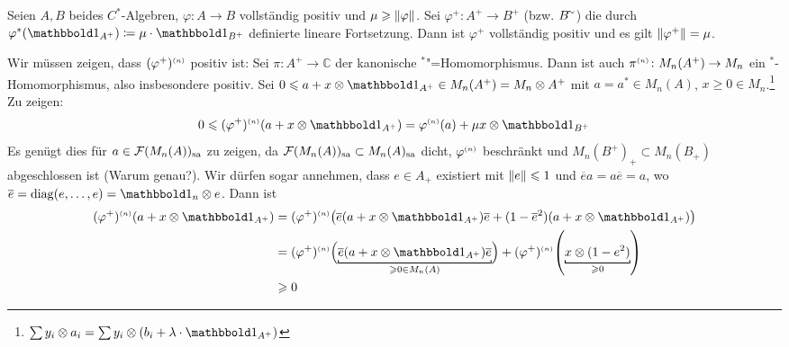\begin{proposition}[label=prop:313]
	Seien $A,B$ beides $C^*$-Algebren, $\varphi \colon A \to B$ vollständig positiv und $\mu \ge \norm*{\varphi}$.
	Sei $\varphi^+ \colon A^+ \to B^+$ (bzw. $B^\simm$) die durch $\varphi^*(\ind_{A^+}) \coloneqq \mu \cdot \ind_{B^+}$ definierte lineare Fortsetzung.
	Dann ist $\varphi^+$ vollständig positiv und es gilt $\norm*{\varphi^+}= \mu$.
\end{proposition}
\begin{beweis}
	Wir müssen zeigen, dass $(\varphi^+)^\ssbrace{n}$ positiv ist: 
	Sei $\pi \colon A^+ \to \mathbb{C}$ der kanonische $^*$"=Homomorphismus.
	Dann ist auch $\pi^\ssbrace{n} \colon M_n(A^+) \to M_n$ ein $^*$-Homomorphismus, also insbesondere positiv.
	Sei $0 \le a + x  \otimes \ind_{A^+} \in M_n(A^+) = M_n \otimes A^+$ mit $a=a^* \in M_n(A)$, $x \ge 0 \in M_n$.\footnote{$\sum y_i \otimes a_i= \sum y_i \otimes (b_i + \lambda \cdot \ind_{A^+})$}
	Zu zeigen: 
	\[
		0 \le (\varphi^+)^\ssbrace{n} \enbrace*{a + x \otimes \ind_{A^+}} = \varphi^\ssbrace{n}(a) + \mu x \otimes \ind_{B^+}
	\]
	Es genügt dies für $a \in \mathcal{F}(M_n(A))_\sa$ zu zeigen, da $\mathcal{F}(M_n(A))_\sa \subset M_n(A)_\sa$ dicht, $\varphi^\ssbrace{n}$ beschränkt und $M_n(B^+)_+ \subset M_n(B_+)$ abgeschlossen ist (Warum genau?).
	Wir dürfen sogar annehmen, dass $e \in A_+$ existiert mit $\norm*{e}\le 1$ und $\overline{e}a = a \overline{e} =a$, wo $\overline{e}= \diag(e,\ldots ,e)=\ind_n \otimes e$.
	Dann ist
	\begin{align}
		(\varphi^+)^\ssbrace{n} (a + x \otimes \ind_{A^+}) &= (\varphi^+)^\ssbrace{n} \enbrace[\big]{\overline{e} \enbrace*{a + x \otimes \ind_{A^+}}\overline{e} + (1- \overline{e}^2) \enbrace*{ a + x \otimes \ind_{A^+}}} \\
		&= (\varphi^+)^\ssbrace{n} \enbrace[\Big]{\Underbracket{\overline{e} \enbrace*{a + x \otimes \ind_{A^+}} \overline{e}}{\ge 0 \in M_n(A)}} + (\varphi^+)^\ssbrace{n} \enbrace*{\Underbracket{x \otimes (1 - e^2)}{\ge 0 }} \\
		&\ge 0
	\end{align}
\end{beweis}

